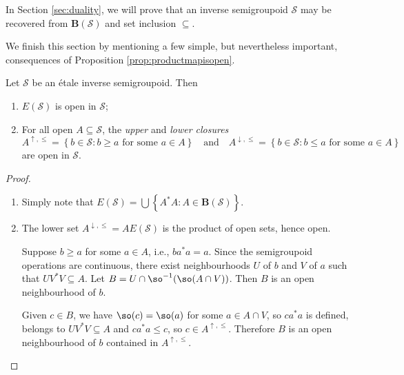 In Section \ref{sec:duality}, we will prove that an inverse semigroupoid $\mathcal{S}$ may be recovered from $\mathbf{B}(\mathcal{S})$ and set inclusion $\subseteq$.

We finish this section by mentioning a few simple, but nevertheless important, consequences of Proposition \ref{prop:productmapisopen}.

\begin{corollary}\label{cor:propertiesopeninversesemigroupoid}
Let $\mathcal{S}$ be an étale inverse semigroupoid. Then
\begin{enumerate}[label=(\alph*)]
    \item\label{cor:propertiesopeninversesemigroupoid1} $E(\mathcal{S})$ is open in  $\mathcal{S}$;
    \item\label{cor:propertiesopeninversesemigroupoid2} For all open $A\subseteq \mathcal{S}$, the \emph{upper} and \emph{lower closures} \[A^{\uparrow,\leq}=\left\{b\in\mathcal{S}:b\geq a\text{ for some }a\in A\right\}\quad\text{and}\quad A^{\downarrow,\leq}=\left\{b\in\mathcal{S}:b\leq a\text{ for some }a\in A\right\}\]
    are open in $\mathcal{S}$.
\end{enumerate}
\end{corollary}
\begin{proof}
\begin{enumerate}[label=\ref{cor:propertiesopeninversesemigroupoid\arabic*}]
    \item Simply note that $E(\mathcal{S})=\bigcup\left\{A^*A:A\in \mathbf{B}(\mathcal{S})\right\}$.
    \item The lower set $A^{\downarrow,\leq}=AE(\mathcal{S})$ is the product of open sets, hence open.
    
    Suppose $b\geq a$ for some $a\in A$, i.e., $ba^*a=a$. Since the semigroupoid operations are continuous, there exist neighbourhoods $U$ of $b$ and $V$ of $a$ such that $UV^*V\subseteq A$. Let $B=U\cap\so^{-1}(\so(A\cap V))$. Then $B$ is an open neighbourhood of $b$.
    
    Given $c\in B$, we have $\so(c)=\so(a)$ for some $a\in A\cap V$, so $ca^*a$ is defined, belongs to $UV^*V\subseteq A$ and $ca^*a\leq c$, so $c\in A^{\uparrow,\leq}$. Therefore $B$ is an open neighbourhood of $b$ contained in $A^{\uparrow,\leq}$.\qedhere
\end{enumerate}
\end{proof}


